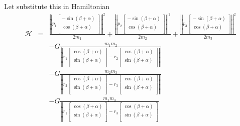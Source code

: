 \begin{itemize}
	Let substitute this in Hamiltonian
	\begin{eqnarray*}
		\mathcal{H} &=& \frac{\left|\left| p_1 \begin{bmatrix}
				-\sin(\beta + \alpha)\\
				\cos(\beta + \alpha)\\
			\end{bmatrix}\right|\right|^2}{2m_1} +\frac{\left|\left| p_2 \begin{bmatrix}
			-\sin(\beta + \alpha)\\
			\cos(\beta + \alpha)\\
		\end{bmatrix}\right|\right|^2}{2m_2}+\frac{\left|\left| p_3 \begin{bmatrix}
		-\sin(\beta + \alpha)\\
		\cos(\beta + \alpha)\\
	\end{bmatrix}\right|\right|^2}{2m_3}\\& & - G\frac{m_1m_2}{\left|\left|r_1 \begin{bmatrix}
	\cos(\beta + \alpha)\\
	\sin(\beta + \alpha)\\
\end{bmatrix} - r_2 \begin{bmatrix}
\cos(\beta + \alpha)\\
\sin(\beta + \alpha)\\
\end{bmatrix}\right|\right|}\\
& &-G\frac{m_2m_3}{\left|\left|r_2 \begin{bmatrix}
\cos(\beta + \alpha)\\
\sin(\beta + \alpha)\\
\end{bmatrix} - r_3 \begin{bmatrix}
\cos(\beta + \alpha)\\
\sin(\beta + \alpha)\\
\end{bmatrix}\right|\right|}\\
& &-G\frac{m_1m_3}{\left|\left|r_1 \begin{bmatrix}
\cos(\beta + \alpha)\\
\sin(\beta + \alpha)\\
\end{bmatrix} - r_3 \begin{bmatrix}
\cos(\beta + \alpha)\\
\sin(\beta + \alpha)\\

\end{bmatrix}}
\end{eqnarray*}
\end{itemize}
